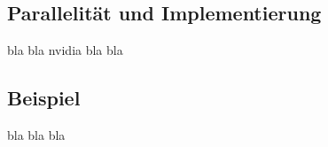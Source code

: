 \subsection{Parallelität und Implementierung}
bla bla nvidia bla bla
\subsection{Beispiel}
bla bla bla 